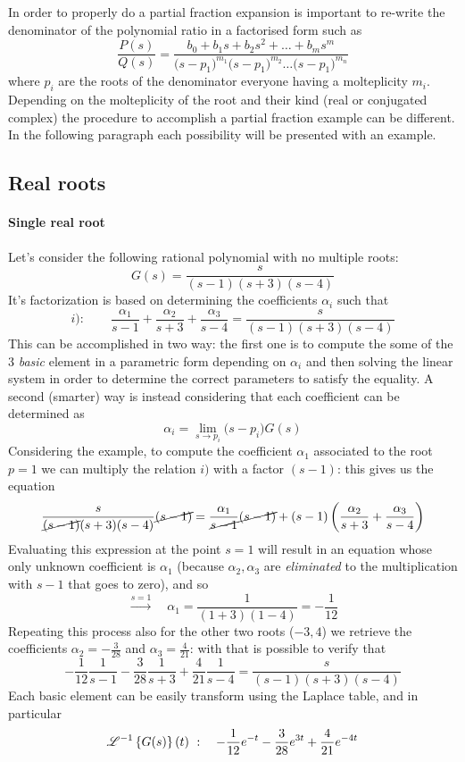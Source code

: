 	In order to properly do a partial fraction expansion is important to re-write the denominator of the polynomial ratio in a factorised form such as
	\[ \frac{P(s)}{Q(s)} = \frac{b_0 + b_1 s + b_2s^2+ \dots + b_ms^m}{\big( s-p_1 \big)^{m_1} \big( s-p_1 \big)^{m_2} \dots \big( s-p_1 \big)^{m_n} } \]
	where $p_i$ are the roots of the denominator everyone having a molteplicity $m_i$. Depending on the molteplicity of the root and their kind (real or conjugated complex) the procedure to accomplish a partial fraction example can be different. In the following paragraph each possibility will be presented with an example.
	
\subsection{Real roots}
	\paragraph{Single real root} Let's consider the following rational polynomial with no multiple roots:
	\[ G(s) = \frac{s}{(s-1)(s+3)(s-4)} \]
	It's factorization is based on determining the coefficients $\alpha_i$ such that
	\[ i): \qquad \frac{\alpha_1}{s-1} + \frac{\alpha_2}{s+3} + \frac{\alpha_3}{s-4} = \frac{s}{(s-1)(s+3)(s-4)} \]
	This can be accomplished in two way: the first one is to compute the some of the 3 \textit{basic} element in a parametric form depending on $\alpha_i$ and then solving the linear system in order to determine the correct parameters to satisfy the equality. A second (smarter) way is instead considering that each coefficient can be determined as
	\[ \alpha_i = \lim_{s\rightarrow p_i} \big(s-p_i\big) G(s) \]
	Considering the example, to compute the coefficient $\alpha_1$ associated to the root $p = 1$ we can multiply the relation $i)$ with a factor $(s-1)$: this gives us the equation
	\[ \frac{s}{\cancel{(s-1)}(s+3)(s-4)} \cancel{(s-1)}= \frac{\alpha_1}{\cancel{s-1}} \cancel{(s-1)} + {(s-1) \left( \frac{\alpha_2}{s+3} + \frac{\alpha_3}{s-4} \right)}  \]
	Evaluating this expression at the point $s=1$ will result in an equation whose only unknown coefficient is $\alpha_1$ (because $\alpha_2,\alpha_3$ are \textit{eliminated} to the multiplication with $s-1$ that goes to zero), and so
	\[\xrightarrow{s=1} \quad \alpha_1 = \frac{1}{(1+3)(1-4)} = -\frac 1 {12} \]
	Repeating this process also for the other two roots ($-3,4$) we retrieve the coefficients $\alpha_2 = -\frac 3 {28}$ and $\alpha_3 = \frac 4 {21}$: with that is possible to verify that
	\[ -\frac 1 {12} \frac 1 {s-1} - \frac 3 {28} \frac 1 {s+3} + \frac 4 {21} \frac{1}{s-4} = \frac{s}{(s-1)(s+3)(s-4)} \]
	Each basic element can be easily transform using the Laplace table, and in particular
	\[ \mathscr{L}^{-1} \left\{ G(s) \right\}(t) \ : \quad -\frac 1 {12} e^{-t} - \frac 3{28} e^{3t} + \frac 4 {21} e^{-4t} \]
	
